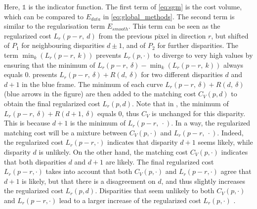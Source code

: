 Here, $\mathds{1}$ is the indicator function. The first term of \cref{eq:sgm} is the cost volume, which can be compared to $E_{data}$ in \cref{eq:global_methods}. The second term is similar to the regularisation term $E_{smooth}$. This term can be seen as the regularized cost $L_r(p-r, ~d)$ from the previous pixel in direction $r$, but shifted of $P_1$ for neighbouring disparities $d\pm1$, and of $P_2$ for further disparities. The term $\min_k(L_r(p-r,~k))$ prevents $L_r(p,\cdot)$ to diverge to very high values by ensuring that the minimum of $L_r(p-r,~\delta) - \min_k(L_r(p-r,~k))$ always equals $0$.  presents $L_r(p-r,~\delta) + R(d, ~\delta)$ for two different disparities $d$ and $d+1$ in the blue frame. The minimum of each curve $L_r(p-r,~\delta) + R(d, ~\delta)$ (blue arrows in the figure) are then added to the matching cost $C_V(p,d)$ to obtain the final regularized cost $L_r(p,d)$. Note that in , the minimum of $L_r(p-r,~\delta)+R(d+1, ~\delta)$ equals $0$, thus $C_V$ is unchanged for this disparity. This is because $d+1$ is the minimum of $L_r(p-r,~\cdot)$. In a way, the regularized matching cost will be a mixture between $C_V(p,\cdot)$ and $L_r(p-r,~\cdot)$. Indeed, the regularized cost $L_r(p-r,\cdot)$ indicates that disparity $d+1$ seems likely, while disparity $d$ is unlikely. On the other hand, the matching cost $C_V(p,\cdot)$ indicates that both disparities $d$ and $d+1$ are likely. The final regularized cost $L_r(p-r,\cdot)$ takes into account that both $C_V(p,\cdot)$ and $L_r(p-r,\cdot)$ agree that $d+1$ is likely, but that there is a disagreement on $d$, and thus slightly increases the regularized cost $L_r(p,d)$. Disparities that seem unlikely to both $C_V(p,\cdot)$ and $L_r(p-r,\cdot)$ lead to a larger increase of the regularized cost $L_r(p,\cdot)$ .
